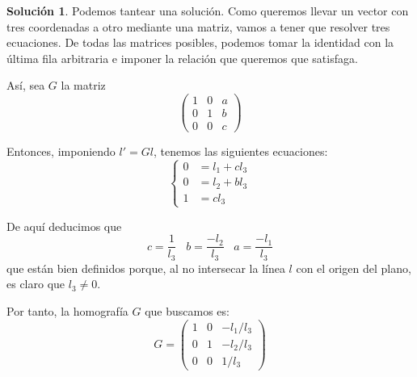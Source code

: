 \documentclass[a4paper, 11pt]{article}
\theoremstyle{definition}
\newtheorem*{solucion}{Solución}
\theoremstyle{theorem}
\begin{document}
  \begin{solucion}
      Podemos tantear una solución. Como queremos llevar un vector con tres coordenadas a otro mediante una matriz, vamos a tener que resolver tres ecuaciones. De todas las matrices posibles, podemos tomar la identidad con la última fila arbitraria e imponer la relación que queremos que satisfaga.

      Así, sea $G$ la matriz
      \[
      \begin{pmatrix}
          1 & 0 & a \\
          0 & 1 & b \\
          0 & 0 & c
      \end{pmatrix}
      \]

      Entonces, imponiendo $l'=Gl$, tenemos las siguientes ecuaciones:
      \[
      \begin{cases}
          0 &= l_1 + cl_3 \\
          0 &= l_2 + bl_3 \\
          1 &= cl_3
      \end{cases}
      \]

      De aquí deducimos que
      \[
      c = \frac{1}{l_3} \;\;\; b = \frac{-l_2}{l_3} \;\;\; a = \frac{-l_1}{l_3}
      \]
      que están bien definidos porque, al no intersecar la línea $l$ con el origen del plano, es claro que $l_3 \neq 0$.

      Por tanto, la homografía $G$ que buscamos es:
      \[
      G =
      \begin{pmatrix}
          1 & 0 & -l_1/l_3 \\
          0 & 1 & -l_2/l_3 \\
          0 & 0 & 1/l_3
      \end{pmatrix}
      \]

  \end{solucion}
\end{document}
